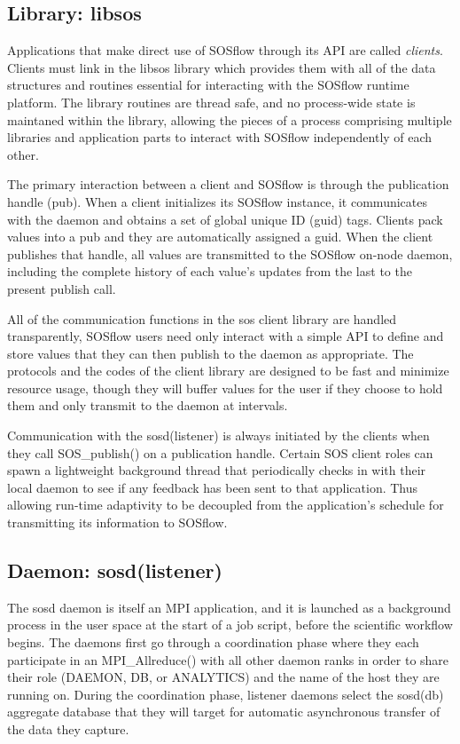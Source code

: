 \subsection{Library: libsos} %
%
Applications that make direct use of SOSflow through its API are called
\textit{clients}.
%
Clients must link in the libsos library which provides them with all of
the data structures and routines essential for interacting with
the SOSflow runtime platform.
%
The library routines are thread safe, and no process-wide state is
maintaned within the library, allowing the pieces of a process
comprising multiple libraries and application parts to interact with
SOSflow independently of each other.
%
\par
The primary interaction between a client and SOSflow is through the
publication handle (pub).
%
When a client initializes its SOSflow instance, it communicates with the
daemon and obtains a set of global unique ID (guid) tags.
%
Clients pack values into a pub and they are automatically assigned a guid.
%
When the client publishes that handle, all values are transmitted to
the SOSflow on-node daemon, including the complete history of each
value's updates from the last to the present publish call.
%
\par
%
All of the communication functions in the sos client library are
handled transparently, SOSflow users need only interact with a simple API
to define and store values that they can then publish to the daemon
as appropriate.
%
The protocols and the codes of the client library are designed to be
fast and minimize resource usage, though they will buffer values for
the user if they choose to hold them and only transmit to the daemon
at intervals.
%
\par
%
Communication with the sosd(listener) is always initiated by the
clients when they call SOS\_publish() on a publication handle.
%
Certain SOS client roles can spawn a lightweight background thread that
periodically checks in with their local daemon to see if any feedback
has been sent to that application. 
%
Thus allowing run-time adaptivity to
be decoupled from the application's schedule for transmitting its
information to SOSflow.


\subsection{Daemon: sosd(listener)} %
The sosd daemon is itself an MPI application, and it is launched as a
background process in the user space at the start of a job script, before
the scientific workflow begins.
%
The daemons first go through a coordination phase where they each
participate in an MPI\_Allreduce() with all other daemon ranks in
order to share their role (DAEMON, DB, or ANALYTICS) and the name of
the host they are running on.
%
During the coordination phase, listener daemons select the sosd(db)
aggregate database that they will target for automatic asynchronous
transfer of the data they capture.

